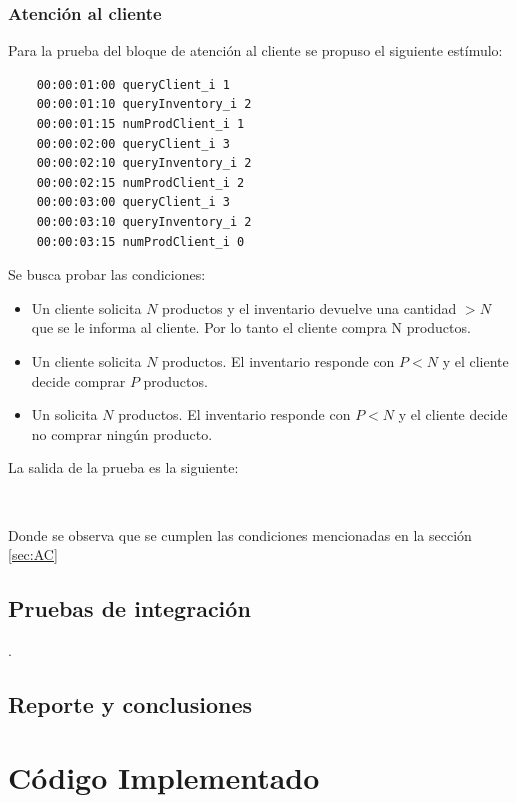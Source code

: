 \documentclass[10pt]{article}
\begin{document}
\subsubsection{Atención al cliente}
Para la prueba del bloque de atención al cliente se propuso el siguiente estímulo:

\begin{minipage}{1\textwidth}
	\centering
	\begin{lstlisting}
	00:00:01:00	queryClient_i 1
	00:00:01:10 queryInventory_i 2
	00:00:01:15 numProdClient_i 1
	00:00:02:00	queryClient_i 3
	00:00:02:10 queryInventory_i 2
	00:00:02:15 numProdClient_i 2
	00:00:03:00	queryClient_i 3
	00:00:03:10 queryInventory_i 2
	00:00:03:15 numProdClient_i 0
	\end{lstlisting}
	
\end{minipage}

Se busca probar las condiciones:
\begin{itemize}
	\item Un cliente solicita $N$ productos y el inventario devuelve una cantidad $> N$ que se le informa al cliente. Por lo tanto el cliente compra N productos.
	\item Un cliente solicita $N$ productos. El inventario responde con $P < N$ y el cliente decide comprar $P$ productos.
	\item Un solicita $N$ productos. El inventario responde con $P < N$ y el cliente decide no comprar ningún producto.
\end{itemize}

La salida de la prueba es la siguiente:

\begin{minipage}{1\textwidth}
	\centering
	\begin{lstlisting}
	
	\end{lstlisting}
	
\end{minipage}
Donde se observa que se cumplen las condiciones mencionadas en la sección \ref{sec:AC}

\subsection{Pruebas de integración}
.
\subsection{Reporte y conclusiones}


\appendix
\section{Código Implementado}



\end{document}
